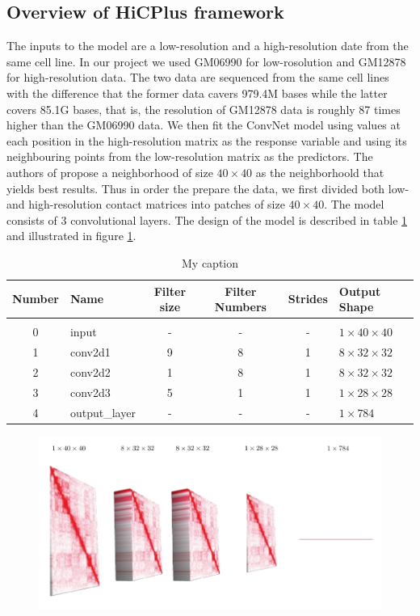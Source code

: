 \documentclass{article}
\begin{document}
\subsection{Overview of HiCPlus framework}
The inputs to the model are a low-resolution
and a high-resolution date from the same
cell line. In our project we used GM06990
for low-rosolution and GM12878 for
high-resolution data. The two data are
sequenced from the same cell lines with
the difference that the former data
cavers 979.4M bases while the latter
covers 85.1G bases, that is, the resolution
of GM12878 data is roughly 87 times higher
than the GM06990 data.
We then fit the ConvNet model using values at 
each position in the high-resolution matrix as 
the response variable and using its 
neighbouring points from the 
low-resolution matrix as the predictors.
The authors of \cite{zhang2018enhancing}
propose a neighborhood of size $40 \times 40$
as the neighborhoold that yields best results.
Thus in order the prepare the data, we first
divided both low- and high-resolution contact
matrices into patches of size $40 \times 40$.
The model consists of 3 convolutional layers.
The design of the model is described in table
\ref{tab:modelDesign} and illustrated in 
figure \ref{fig:modelDesign}.
\begin{table}[]
    \centering
    \begin{tabular}{clcccl}
        Number   & Name           & Filter size & Filter Numbers & Strides & Output Shape \\[5pt] \hline \hline\\
        0        & input          &   -         &-               &    -    & $1\times40\times40$    \\[5pt]
        1        & conv2d1        & 9           & 8              & 1       & $8\times32\times32$    \\[5pt]
        2        & conv2d2        & 1           & 8              & 1       & $8\times32\times32$    \\[5pt]
        3        & conv2d3        & 5           & 1              & 1       & $1\times28\times28$    \\[5pt]
        4        & output\_layer  &     -       &   -            &   -     & $1\times784$     \\[30pt]
    \end{tabular}
    \caption{My caption}
    \label{tab:modelDesign}
\end{table}
\begin{figure}[H]
    \centering
    \includegraphics[width=\textwidth]{model.jpg}
    \caption{}
    \label{fig:modelDesign}
\end{figure}
\end{document}
